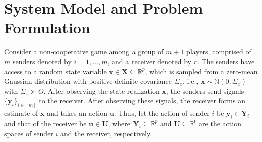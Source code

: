 \documentclass[12pt,journal,onecolumn]{IEEEtran}
\begin{document}
\section{System Model and Problem Formulation}\label{Sect:system_model}
Consider a non-cooperative game among  a group of $m+1$ players, comprised of $m$ senders denoted by $i =1,\dots,m$, and a receiver denoted by $r$. The senders have access to a random state variable $\boldsymbol{x}\in \boldsymbol{X}\subseteq  \mathbb{R}^p$, which is sampled from a zero-mean Gaussian distribution with positive-definite covariance $\Sigma_x$, i.e., $ \boldsymbol{x}\sim \mathbb{N}(0,\Sigma_x)$ with $\Sigma_x\succ O$. After observing the state realization $ \boldsymbol{x}$, %
the senders send signals $\{\boldsymbol{y}_i\}_{i\in[m]}$ to the receiver. After observing these signals, %
 the receiver forms an estimate of $\boldsymbol{x}$  and takes an action $\boldsymbol{u}$. Thus, let the action of sender $i$ be $\boldsymbol{y}_i\in\boldsymbol{Y}_i$ and that of the receiver be $\boldsymbol{u}\in\boldsymbol{U}$, where  $\boldsymbol{Y}_i\subseteq \mathbb{R}^p$ and  $\mathbf{U}\subseteq \mathbb{R}^t$ are the action spaces of sender $i$ and the receiver, respectively. %
 
\end{document}
